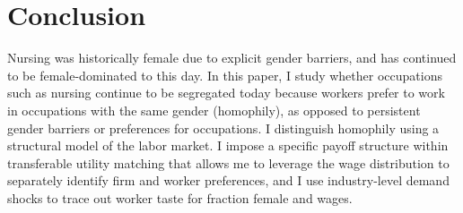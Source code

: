 \documentclass[12pt]{article}
\begin{document}
\section{Conclusion}









Nursing was historically female due to explicit gender barriers, and has continued to be female-dominated to this day. In this paper, I study whether occupations such as nursing continue to be segregated today because workers prefer to work in occupations with the same gender (homophily), as opposed to persistent gender barriers or preferences for occupations. I distinguish homophily using a structural model of the labor market. I impose a specific payoff structure within transferable utility matching that allows me to leverage the wage distribution to separately identify firm and worker preferences, and I use industry-level demand shocks to trace out worker taste for fraction female and wages.
\end{document}
